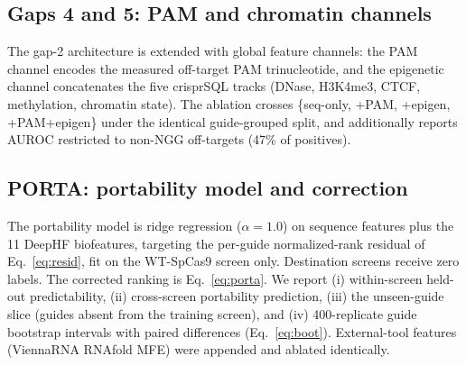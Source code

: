 \subsection{Gaps 4 and 5: PAM and chromatin channels}
The gap-2 architecture is extended with global feature channels: the PAM
channel encodes the measured off-target PAM trinucleotide, and the
epigenetic channel concatenates the five crisprSQL tracks (DNase,
H3K4me3, CTCF, methylation, chromatin state). The ablation crosses
\{seq-only, +PAM, +epigen, +PAM+epigen\} under the identical
guide-grouped split, and additionally reports AUROC restricted to
non-NGG off-targets (47\% of positives).

\subsection{PORTA: portability model and correction}
The portability model is ridge regression ($\alpha=1.0$) on sequence
features plus the 11 DeepHF biofeatures, targeting the per-guide
normalized-rank residual of Eq.~\eqref{eq:resid}, fit on the WT-SpCas9
screen only. Destination screens receive zero labels. The corrected
ranking is Eq.~\eqref{eq:porta}. We report (i) within-screen held-out
predictability, (ii) cross-screen portability prediction, (iii) the
unseen-guide slice (guides absent from the training screen), and (iv)
400-replicate guide bootstrap intervals with paired differences
(Eq.~\eqref{eq:boot}). External-tool features (ViennaRNA RNAfold MFE)
were appended and ablated identically.
